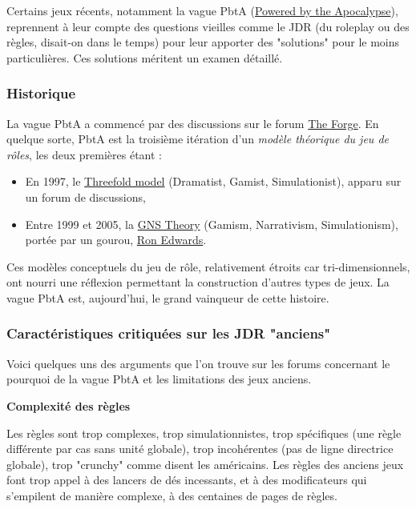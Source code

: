 \documentclass[a4paper, 11pt, twoside]{article}
\begin{document}
Certains jeux récents, notamment la vague PbtA (\href{https://en.wikipedia.org/wiki/Powered\_by\_the\_Apocalypse}{Powered by the Apocalypse}), reprennent à leur compte des questions vieilles comme le JDR (du roleplay ou des règles, disait-on dans le temps) pour leur apporter des "solutions" pour le moins particulières. Ces solutions méritent un examen détaillé.

\subsubsection{Historique}
\label{sec:org1a56790}

La vague PbtA a commencé par des discussions sur le forum \href{https://github.com/orey/ttrpg\#the-forge}{The Forge}. En quelque sorte, PbtA est la troisième itération d'un \emph{modèle théorique du jeu de rôles}, les deux premières étant :
\begin{itemize}
\item En 1997, le \href{https://en.wikipedia.org/wiki/Threefold\_model}{Threefold model} (Dramatist, Gamist, Simulationist), apparu sur un forum de discussions,
\item Entre 1999 et 2005, la \href{https://en.wikipedia.org/wiki/GNS\_theory}{GNS Theory} (Gamism, Narrativism, Simulationism), portée par un gourou, \href{https://en.wikipedia.org/wiki/Ron\_Edwards\_(game\_designer)}{Ron Edwards}.
\end{itemize}

Ces modèles conceptuels du jeu de rôle, relativement étroits car tri-dimensionnels, ont nourri une réflexion permettant la construction d'autres types de jeux. La vague PbtA est, aujourd'hui, le grand vainqueur de cette histoire.

\subsubsection{Caractéristiques critiquées sur les JDR "anciens"}
\label{sec:orga566578}

Voici quelques uns des arguments que l'on trouve sur les forums concernant le pourquoi de la vague PbtA et les limitations des jeux anciens.

\textbf{Complexité des règles}

Les règles sont trop complexes, trop simulationnistes, trop spécifiques (une règle différente par cas sans unité globale), trop incohérentes (pas de ligne directrice globale), trop "crunchy" comme disent les américains. Les règles des anciens jeux font trop appel à des lancers de dés incessants, et à des modificateurs qui s'empilent de manière complexe, à des centaines de pages de règles.
\end{document}
